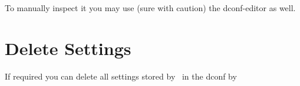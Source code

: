 To manually inspect it you may use (sure with caution) the dconf-editor as well.

\section{Delete Settings}
\label{sec:Gxsm-quick-ResetingSettings}

If required you can delete all settings stored by \Gxsm\ in the dconf by\\ \\
